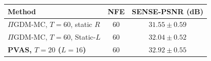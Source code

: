 \begin{tabular}{lcc}
\toprule
Method & NFE & SENSE-PSNR (dB) \\
\midrule
$\Pi$GDM-MC, $T{=}60$, static $R$ & 60 & $31.55 \pm 0.59$ \\
$\Pi$GDM-MC, $T{=}60$, Static-$L$ & 60 & $32.04 \pm 0.52$ \\
\textbf{PVAS, $T{=}20$ ($L{=}16$)} & 60 & $\mathbf{32.92 \pm 0.55}$ \\
\bottomrule
\end{tabular}
